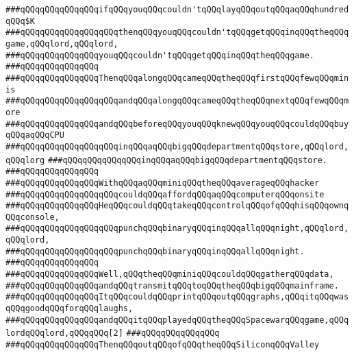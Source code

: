 \verb|###qQQqqQQqqQQqqQQqifqQQqyouqQQqcouldn'tqQQqlayqQQqoutqQQqaqQQqhundredqQQq$K|\newline
\verb|###qQQqqQQqqQQqqQQqqQQqthenqQQqyouqQQqcouldn'tqQQqgetqQQqinqQQqtheqQQqgame,qQQqlord,qQQqlord,|\newline
\verb|###qQQqqQQqqQQqqQQqyouqQQqcouldn'tqQQqgetqQQqinqQQqtheqQQqgame.|\newline
\verb|###qQQqqQQqqQQqqQQq|\newline
\verb|###qQQqqQQqqQQqqQQqThenqQQqalongqQQqcameqQQqtheqQQqfirstqQQqfewqQQqminis|\newline
\verb|###qQQqqQQqqQQqqQQqqQQqandqQQqalongqQQqcameqQQqtheqQQqnextqQQqfewqQQqmore|\newline
\verb|###qQQqqQQqqQQqqQQqandqQQqbeforeqQQqyouqQQqknewqQQqyouqQQqcouldqQQqbuyqQQqaqQQqCPU|\newline
\verb|###qQQqqQQqqQQqqQQqqQQqinqQQqaqQQqbigqQQqdepartmentqQQqstore,qQQqlord,qQQqlorg|\newline
\verb|###qQQqqQQqqQQqqQQqinqQQqaqQQqbigqQQqdepartmentqQQqstore.|\newline
\verb|###qQQqqQQqqQQqqQQq|\newline
\verb|###qQQqqQQqqQQqqQQqWithqQQqaqQQqminiqQQqtheqQQqaverageqQQqhacker|\newline
\verb|###qQQqqQQqqQQqqQQqqQQqcouldqQQqaffordqQQqaqQQqcomputerqQQqonsite|\newline
\verb|###qQQqqQQqqQQqqQQqHeqQQqcouldqQQqtakeqQQqcontrolqQQqofqQQqhisqQQqownqQQqconsole,|\newline
\verb|###qQQqqQQqqQQqqQQqqQQqpunchqQQqbinaryqQQqinqQQqallqQQqnight,qQQqlord,qQQqlord,|\newline
\verb|###qQQqqQQqqQQqqQQqqQQqpunchqQQqbinaryqQQqinqQQqallqQQqnight.|\newline
\verb|###qQQqqQQqqQQqqQQq|\newline
\verb|###qQQqqQQqqQQqqQQqWell,qQQqtheqQQqminiqQQqcouldqQQqgatherqQQqdata,|\newline
\verb|###qQQqqQQqqQQqqQQqandqQQqtransmitqQQqtoqQQqtheqQQqbigqQQqmainframe.|\newline
\verb|###qQQqqQQqqQQqqQQqItqQQqcouldqQQqprintqQQqoutqQQqgraphs,qQQqitqQQqwasqQQqgoodqQQqforqQQqlaughs,|\newline
\verb|###qQQqqQQqqQQqqQQqandqQQqitqQQqplayedqQQqtheqQQqSpacewarqQQqgame,qQQqlordqQQqlord,qQQqqQQq[2]|\newline
\verb|###qQQqqQQqqQQqqQQq|\newline
\verb|###qQQqqQQqqQQqqQQqThenqQQqoutqQQqofqQQqtheqQQqSiliconqQQqValley|\newline
